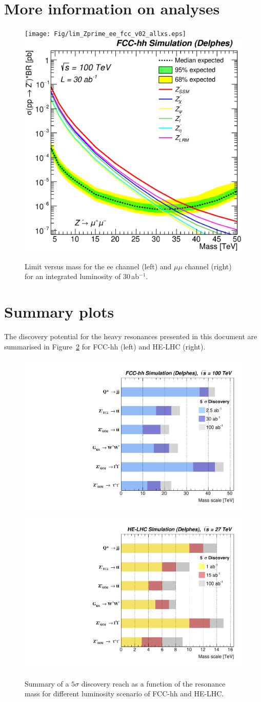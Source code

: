 \documentclass[a4paper,11pt]{article}
\begin{document}
\section{More information on analyses}
\label{app:anamore}
\begin{figure}[!htb]
  \centering
  \texttt{[image: Fig/lim\_Zprime\_ee\_fcc\_v02\_allxs.eps]}
  \includegraphics[width=0.35\columnwidth]{Fig/lim_Zprime_mumu_fcc_v02_allxs.eps}
  \caption{Limit versus mass for the ee channel (left) and $\mu\mu$ channel (right) for an integrated luminosity of $30$\,ab$^{-1}$. }
  \label{figure:leptonicresonances:resultseemumu}
\end{figure}


\section{Summary plots}
The discovery potential for the heavy resonances presented in this document are summarised in Figure~\ref{figure:resonances100:summary} for FCC-hh (left) and HE-LHC (right).
\begin{figure}[!htb]
  \centering
  \includegraphics[width=0.49\columnwidth]{Fig/summaryDisco_onlyFCChh.pdf}
  \includegraphics[width=0.49\columnwidth]{Fig/summaryDisco_onlyHELHC.pdf}
  \caption{Summary of a $5\sigma$ discovery reach as a function of the resonance mass for different luminosity scenario of FCC-hh and HE-LHC.}
  \label{figure:resonances100:summary}
\end{figure}
\end{document}
